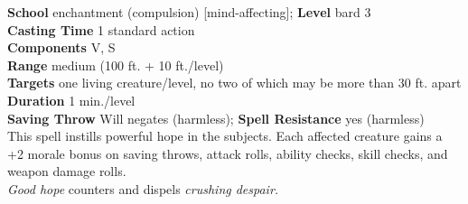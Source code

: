 \textbf{School} enchantment (compulsion) [mind-affecting]; \textbf{Level} bard 3\\
\textbf{Casting Time} 1 standard action\\
\textbf{Components} V, S\\
\textbf{Range }medium (100 ft. + 10 ft./level)\\
\textbf{Targets} one living creature/level, no two of which may be more than 30 ft. apart\\
\textbf{Duration} 1 min./level\\
\textbf{Saving Throw }Will negates (harmless); \textbf{Spell Resistance} yes (harmless)\\
This spell instills powerful hope in the subjects. Each affected creature gains a +2 morale bonus on saving throws, attack rolls, ability checks, skill checks, and weapon damage rolls.\\
\textit{Good hope} counters and dispels \textit{crushing despair.}\\
